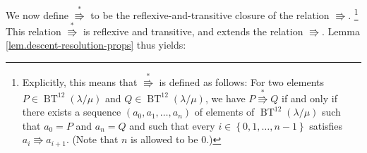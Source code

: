 \documentclass[numbers=enddot,12pt,final,onecolumn,notitlepage]{scrartcl}%
\theoremstyle{definition}
\newenvironment{proof}[1][Proof]{\noindent\textbf{#1.} }{\ \rule{0.5em}{0.5em}}
\def\BenignTables{{\operatorname{BT}^{12}\left(  \lambda/\mu\right)}}
\begin{document}





We now define $\overset{\ast}{\Rrightarrow}$ to be the
reflexive-and-transitive closure of the relation $\Rrightarrow$.
\footnote{Explicitly, this means that $\overset{\ast}{\Rrightarrow}$
is defined as follows: For two elements $P\in\BenignTables$ and $Q\in\BenignTables$,
we have $P\overset{\ast}{\Rrightarrow}Q$ if and only if there exists a
sequence $\left(  a_{0},a_{1},\ldots,a_{n}\right)  $ of elements of
$\BenignTables$ such that $a_{0}=P$ and $a_{n}=Q$ and such that every
$i\in\left\{  0,1,\ldots,n-1\right\}  $ satisfies $a_{i}\Rrightarrow a_{i+1}%
$. (Note that $n$ is allowed to be $0$.)}
This relation $\overset{\ast}{\Rrightarrow}$ is reflexive and transitive,
and extends the relation $\Rrightarrow$.
Lemma \ref{lem.descent-resolution-props} thus yields:
\end{document}
